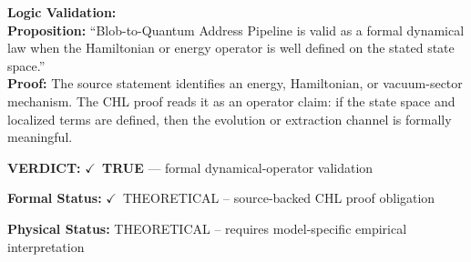 \textbf{Logic Validation:}\\
\textbf{Proposition:} ``Blob-to-Quantum Address Pipeline is valid as a formal dynamical law when the Hamiltonian
or energy operator is well defined on the stated state space.''\\
\textbf{Proof:} The source statement identifies an energy, Hamiltonian, or vacuum-sector mechanism. The
CHL proof reads it as an operator claim: if the state space and localized terms are
defined, then the evolution or extraction channel is formally meaningful.

\textbf{VERDICT:} \ensuremath{\checkmark}\ \textbf{TRUE} --- formal dynamical-operator validation

\textbf{Formal Status:} \ensuremath{\checkmark}\ THEORETICAL -- source-backed CHL proof obligation

\textbf{Physical Status:} THEORETICAL -- requires model-specific empirical interpretation
\par\vspace{0.45em}
\par
\ifTZPDarkEdition
{}
\fi
\endgroup
\endgroup
